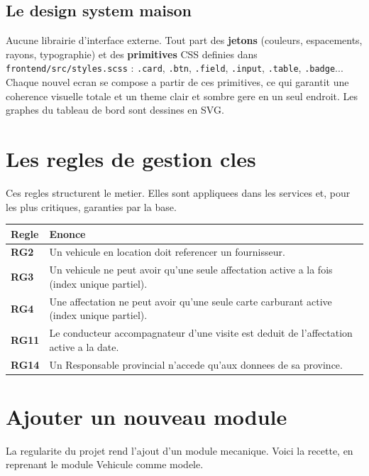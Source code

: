 \documentclass[11pt]{article}
\begin{document}
\subsection{Le design system maison}
Aucune librairie d'interface externe. Tout part des \textbf{jetons} (couleurs, espacements, rayons,
typographie) et des \textbf{primitives} CSS definies dans \texttt{frontend/src/styles.scss} :
\texttt{.card}, \texttt{.btn}, \texttt{.field}, \texttt{.input}, \texttt{.table}, \texttt{.badge}...
Chaque nouvel ecran se compose a partir de ces primitives, ce qui garantit une coherence visuelle totale
et un theme clair et sombre gere en un seul endroit. Les graphes du tableau de bord sont dessines en SVG.

\section{Les regles de gestion cles}
Ces regles structurent le metier. Elles sont appliquees dans les services et, pour les plus critiques,
garanties par la base.
\begin{center}
\renewcommand{\arraystretch}{1.3}
\begin{tabularx}{\linewidth}{>{\bfseries}l Y}
\toprule
{} Regle & Enonce \\
\midrule
RG2  & Un vehicule en location doit referencer un fournisseur. \\
RG3  & Un vehicule ne peut avoir qu'une seule affectation active a la fois (index unique partiel). \\
RG4  & Une affectation ne peut avoir qu'une seule carte carburant active (index unique partiel). \\
RG11 & Le conducteur accompagnateur d'une visite est deduit de l'affectation active a la date. \\
RG14 & Un Responsable provincial n'accede qu'aux donnees de sa province. \\
\bottomrule
\end{tabularx}
\end{center}

\section{Ajouter un nouveau module}
La regularite du projet rend l'ajout d'un module mecanique. Voici la recette, en reprenant le module
Vehicule comme modele.
\end{document}
